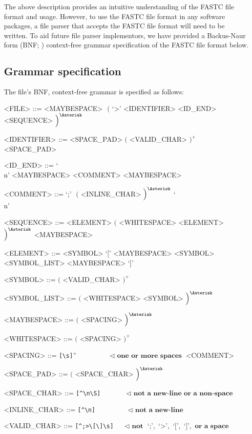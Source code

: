 \documentclass[12pt]{article}
\begin{document}
The above description provides an intuitive understanding of the FASTC file format and usage. However, to use the FASTC file format in any software packages, a file parser that accepts the FASTC file format will need to be written. To aid future file parser implementors, we have provided a Backus-Naur form (BNF; \citealp{Naur1961}) context-free grammar specification of the FASTC file format below.

\pagebreak

\subsection{Grammar specification}
The file's BNF, context-free grammar is specified as follows:

\setlength{\grammarindent}{10em} %

\begin{grammar}

  <FILE>         ::=  <MAYBESPACE> $\,\,\Big($ `>' <IDENTIFIER> <ID_END> <SEQUENCE> $\Big)^{\Asterisk}$

  <IDENTIFIER>   ::=  <SPACE_PAD> $\Big($ <VALID_CHAR> $\Big)^{+}$ <SPACE_PAD>

  <ID_END>       ::=  `\\n' <MAYBESPACE>
                 \alt <COMMENT> <MAYBESPACE>

  <COMMENT>      ::=  `;' $\,\,\Big($ <INLINE_CHAR> $\Big)^{\Asterisk}$ `\\n'

  <SEQUENCE>     ::=  <ELEMENT> $\Big($ <WHITESPACE> <ELEMENT> $\Big)^{\Asterisk}$ <MAYBESPACE>
  
  <ELEMENT>      ::=  <SYMBOL>
                 \alt `[' <MAYBESPACE> <SYMBOL> <SYMBOL_LIST> <MAYBESPACE> `]'
 
  <SYMBOL>       ::=  $\Big($ <VALID_CHAR> $\Big)^{+}$
                 
  <SYMBOL_LIST>  ::=  $\Big($ <WHITESPACE> <SYMBOL> $\Big)^{\Asterisk}$
  
  <MAYBESPACE>   ::=  $\Big($ <SPACING> $\Big)^{\Asterisk}$

  <WHITESPACE>   ::=  $\Big($ <SPACING>  $\Big)^{+}$

  <SPACING>      ::=  \verb![\s]!$^{+}$  $\quad\,\quad\quad\quad \lhd \,\, \textbf{one or more spaces}$
                 \alt <COMMENT>

  <SPACE_PAD>    ::=  $\Big($ <SPACE_CHAR> $\Big)^{\Asterisk}$

  <SPACE_CHAR>   ::=  \verb![^\n\S]!     $\quad\,\quad\quad      \lhd \,\, \textbf{not a new-line or a non-space}$

  <INLINE_CHAR>  ::=  \verb![^\n]!       $\quad\,\quad\quad\quad \lhd \,\, \textbf{not a new-line}$

  <VALID_CHAR>   ::=  \verb![^;>\[\]\s]! $\quad                  \lhd \,\, \textbf{not}$ `;',$\,$ `>',$\,$ `[',$\,$ `]', $\,\textbf{or a space}$


  
\end{grammar}
\end{document}
